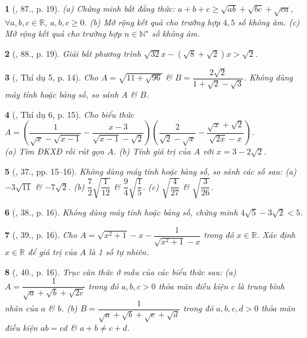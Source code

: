 \documentclass{article}
\newtheorem{baitoan}{}%
\begin{document}
\begin{baitoan}[\cite{SBT_Toan_9_tap_1}, 87., p. 19]
	(a) Chứng minh bất đẳng thức: $a + b + c\ge\sqrt{ab} + \sqrt{bc} + \sqrt{ca}$,  $\forall a,b,c\in\mathbb{R}$, $a,b,c\ge0$. (b) Mở rộng kết quả cho trường hợp $4,5$ số không âm. (c) Mở rộng kết quả cho trường hợp $n\in\mathbb{N}^\star$ số không âm.
\end{baitoan}

\begin{baitoan}[\cite{SBT_Toan_9_tap_1}, 88., p. 19]
	Giải bất phương trình $\sqrt{32}x - (\sqrt{8} + \sqrt{2})x > \sqrt{2}$.
\end{baitoan}

\begin{baitoan}[\cite{Tuyen_Toan_9_old}, Thí dụ 5, p. 14]
	Cho $A = \sqrt{11 + \sqrt{96}}$ \& $B = \dfrac{2\sqrt{2}}{1 + \sqrt{2} - \sqrt{3}}$. Không dùng máy tính hoặc bảng số, so sánh $A$ \& $B$.
\end{baitoan}

\begin{baitoan}[\cite{Tuyen_Toan_9_old}, Thí dụ 6, p. 15]
	Cho biểu thức $A = \left(\dfrac{1}{\sqrt{x} - \sqrt{x - 1}} - \dfrac{x - 3}{\sqrt{x - 1} - \sqrt{2}}\right)\left(\dfrac{2}{\sqrt{2} - \sqrt{x}} - \dfrac{\sqrt{x} + \sqrt{2}}{\sqrt{2x} - x}\right)$.\\(a) Tìm ĐKXĐ rồi rút gọn $A$. (b) Tính giá trị của $A$ với $x = 3 - 2\sqrt{2}$.
\end{baitoan}

\begin{baitoan}[\cite{Tuyen_Toan_9_old}, 37., pp. 15--16]
	Không dùng máy tính hoặc bảng số, so sánh các số sau: (a) $-3\sqrt{11}$ \& $-7\sqrt{2}$. (b) $\dfrac{7}{2}\sqrt{\dfrac{1}{12}}$ \& $\dfrac{9}{4}\sqrt{\dfrac{1}{5}}$. (c) $\sqrt{\dfrac{4}{27}}$ \& $\sqrt{\dfrac{3}{26}}$.
\end{baitoan}

\begin{baitoan}[\cite{Tuyen_Toan_9_old}, 38., p. 16]
	Không dùng máy tính hoặc bảng số, chứng minh $4\sqrt{5} - 3\sqrt{2} < 5$.
\end{baitoan}

\begin{baitoan}[\cite{Tuyen_Toan_9_old}, 39., p. 16]
	Cho $A = \sqrt{x^2 + 1} - x - \dfrac{1}{\sqrt{x^2 + 1} - x}$ trong đó $x\in\mathbb{R}$. Xác định $x\in\mathbb{R}$ để giá trị của $A$ là 1 số tự nhiên.
\end{baitoan}

\begin{baitoan}[\cite{Tuyen_Toan_9_old}, 40., p. 16]
	Trục căn thức ở mẫu của các biểu thức sau: (a) $A = \dfrac{1}{\sqrt{a} + \sqrt{b} + \sqrt{2c}}$ trong đó $a,b,c > 0$ thỏa mãn điều kiện $c$ là trung bình nhân của $a$ \& $b$. (b) $B = \dfrac{1}{\sqrt{a} + \sqrt{b} + \sqrt{c} + \sqrt{d}}$ trong đó $a,b,c,d > 0$ thỏa mãn điều kiện $ab = cd$ \& $a + b\ne c + d$.
\end{baitoan}
\end{document}
